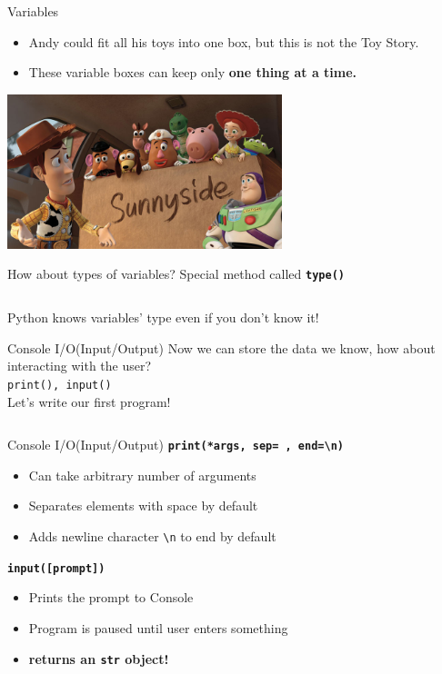 		
		\begin{frame}{Variables}
		    \begin{itemize}
				\LARGE 
				\pause
				\item Andy could fit all his toys into one box, but this is not the Toy Story.
				\pause
				\item These variable boxes can keep only \textbf{one thing at a time.}
		    \end{itemize}
			\vspace{2mm}
		    \centering
            \includegraphics[width=0.6\textwidth]{images/box_many.jpg}
		\end{frame}
		
		\begin{frame}{How about types of variables?}
			\LARGE
			Special method called \texttt{\textbf{type()}} 
			\inputminted[frame=single,framesep=2pt]{python3}{code-examples/types.py}
			Python knows variables' type even if you don't know it!
		\end{frame}

		\begin{frame}{Console I/O(Input/Output)}
			\LARGE
			Now we can store the data we know,
			\pause
			 how about interacting with the user? \\
			\pause
			\texttt{print(), input()}\\
			\pause
			Let's write our first program!
			\pause
			\inputminted[frame=single,framesep=2pt]{python3}{code-examples/io.py}
		\end{frame}

		\begin{frame}{Console I/O(Input/Output)}
			\huge
			\textbf{\texttt{print(*args, sep=\textquotesingle \ \textquotesingle, end=\textquotesingle \textbackslash n\textquotesingle )}}
			\pause
			\begin{itemize}
				\LARGE
				\item Can take arbitrary number of arguments
				\pause
				\item Separates elements with space by default
				\pause
				\item Adds newline character \texttt{\textquotesingle \textbackslash n\textquotesingle} to end by default
			\end{itemize}
			
			\pause
			\textbf{\texttt{input([prompt])}}
			\pause
			\begin{itemize}
				\LARGE
				\item Prints the prompt to Console
				\pause
				\item Program is paused until user enters something
				\pause
				\item \textbf{returns an \texttt{str} object!} 
			\end{itemize}
		\end{frame}

